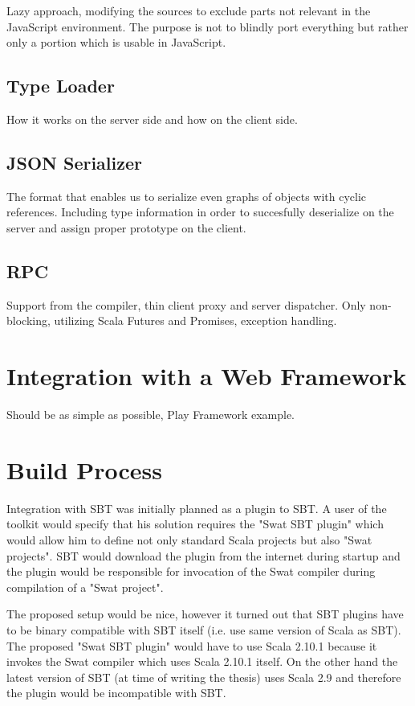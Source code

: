 \documentclass[12pt,a4paper]{report}
\begin{document}
Lazy approach, modifying the sources to exclude parts not relevant in the JavaScript environment. The purpose is not to blindly port everything but rather only a portion which is usable in JavaScript.

\subsection{Type Loader}

How it works on the server side and how on the client side.

\subsection{JSON Serializer}

The format that enables us to serialize even graphs of objects with cyclic references. Including type information in order to succesfully deserialize on the server and assign proper prototype on the client.

\subsection{RPC}

Support from the compiler, thin client proxy and server dispatcher. Only non-blocking, utilizing Scala Futures and Promises, exception handling.

\section{Integration with a Web Framework}

Should be as simple as possible, Play Framework example.

\section{Build Process}

Integration with SBT was initially planned as a plugin to SBT. A user of the toolkit would specify that his solution requires the "Swat SBT plugin" which would allow him to define not only standard Scala projects but also "Swat projects". SBT would download the plugin from the internet during startup and the plugin would be responsible for invocation of the Swat compiler during compilation of a "Swat project". 

The proposed setup would be nice, however it turned out that SBT plugins have to be binary compatible with SBT itself (i.e. use same version of Scala as SBT). The proposed "Swat SBT plugin" would have to use Scala 2.10.1 because it invokes the Swat compiler which uses Scala 2.10.1 itself. On the other hand the latest version of SBT (at time of writing the thesis) uses Scala 2.9 and therefore the plugin would be incompatible with SBT.
\end{document}
